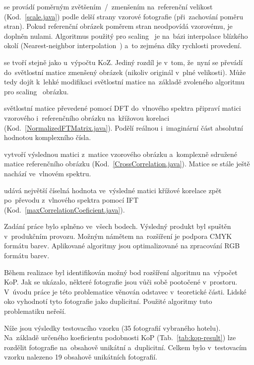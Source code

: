  se provádí poměrným zvětšením~/~zmenšením na~referenční velikost (Kod.~\ref{scale.java}) podle delší strany vzorové fotografie (při~zachování poměru stran). Pokud referenční obrázek poměrem stran neodpovídá vzorovému, je doplněn nulami. Algoritmus použitý pro scaling~\cite{scaling} je na~bázi interpolace blízkého okolí (Nearest-neighbor interpolation~\cite{nearest-neighbor-interpolation}) a~to zejména díky rychlosti provedení.

 se tvoří stejně jako u~výpočtu KoZ. Jediný rozdíl je v~tom, že~nyní se převádí do~světlostní matice zmenšený obrázek (nikoliv originál v~plné velikosti). Může tedy dojít k~lehké modifikaci světlostní matice na~základě zvoleného algoritmu pro scaling~\cite{scaling} obrázku.

 světlostní matice převedené pomocí DFT do~vlnového spektra připraví matici vzorového i~referenčního obrázku na~křížovou korelaci (Kod.~\ref{NormalizedFTMatrix.java}). Podělí reálnou i~imaginární část absolutní hodnotou komplexního čísla.

 vytvoří výslednou matici z~matice vzorového obrázku a~komplexně sdružené matice referenčního obrázku (Kod.~\ref{CrossCorrelation.java}). Matice se stále ještě nachází ve~vlnovém spektru.

udává největší číselná hodnota ve~výsledné matici křížové korelace zpět po~převodu z~vlnového spektra pomocí IFT (Kod.~\ref{maxCorrelationCoeficient.java}).


Zadání práce bylo splněno ve~všech bodech. Výsledný produkt byl spuštěn v~produkčním provozu. Možným námětem na~rozšíření je podpora CMYK~\cite{cmyk} formátu barev. Aplikované algoritmy jsou optimalizované na zpracování RGB formátu barev.

Během realizace byl identifikován možný bod rozšíření algoritmu na~výpočet KoP. Jak se ukázalo, některé fotografie jsou vůči sobě pootočené v~prostoru. V~úvodu práce je této problematice věnován odstavec v~teoretické části. Lidské oko vyhodnotí tyto fotografie jako duplicitní. Použité algoritmy tuto problematiku neřeší.

Níže jsou výsledky testovacího vzorku (35 fotografií vybraného hotelu). Na~základě určeného koeficientu podobnosti KoP (Tab.~\ref{tab:kop-result}) lze rozdělit fotografie na~obsahově unikátní a~duplicitní. Celkem bylo v~testovacím vzorku nalezeno 19 obsahově unikátních fotografií.

